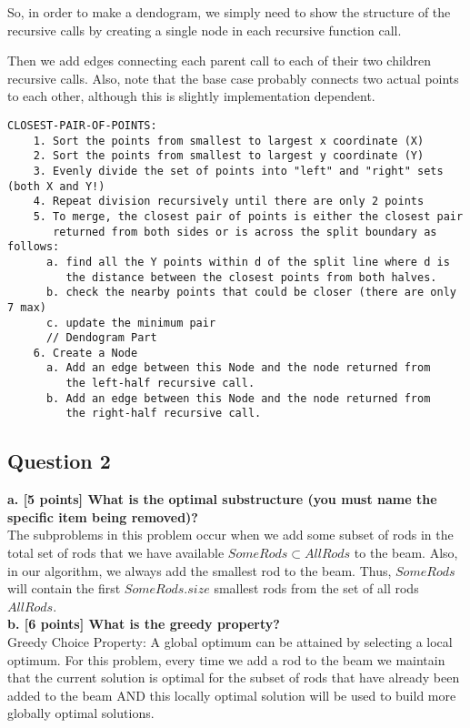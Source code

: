 \documentclass[12pt]{article}
\begin{document}
So, in order to make a dendogram, we simply need to show the structure of the recursive calls by 
creating a single node in each recursive function call. 

Then we add edges connecting each parent call to each of their two children recursive calls. 
Also, note that the base case probably connects two actual points to each other, 
although this is slightly implementation dependent.

\begin{verbatim}
CLOSEST-PAIR-OF-POINTS:
	1. Sort the points from smallest to largest x coordinate (X)
	2. Sort the points from smallest to largest y coordinate (Y)
	3. Evenly divide the set of points into "left" and "right" sets (both X and Y!)
	4. Repeat division recursively until there are only 2 points
	5. To merge, the closest pair of points is either the closest pair 
	   returned from both sides or is across the split boundary as follows:
	  a. find all the Y points within d of the split line where d is 
	     the distance between the closest points from both halves.
	  b. check the nearby points that could be closer (there are only 7 max)
	  c. update the minimum pair 
	  // Dendogram Part
	6. Create a Node 
	  a. Add an edge between this Node and the node returned from 
	     the left-half recursive call.
	  b. Add an edge between this Node and the node returned from 
	     the right-half recursive call.
\end{verbatim}

\subsection*{Question 2}
\textbf{a. [5 points] What is the optimal substructure (you must name the specific item being removed)?} \\

The subproblems in this problem occur when we add some subset of rods in the total set of rods that we have available $SomeRods \subset AllRods$ to the beam. Also, in our algorithm, we always add the smallest rod to the beam. Thus, $SomeRods$ will contain the first $SomeRods.size$ smallest rods from the set of all rods $AllRods$.  \\

\noindent \textbf{b. [6 points] What is the greedy property? } \\

Greedy Choice Property: A global optimum can be attained by selecting a local optimum. For this problem, every time we add a rod to the beam we maintain that the current solution is optimal for the subset of rods that have already been added to the beam AND this locally optimal solution will be used to build more globally optimal solutions. 
\end{document}
